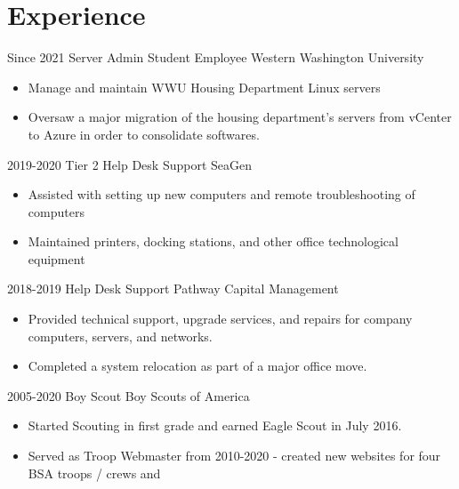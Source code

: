 \documentclass[letterpaper]{twentysecondcv} %
\begin{document}
\begin{twentyshort} %
\end{twentyshort}


\section{Experience}

\begin{twenty} %
	\twentyitem
	{Since 2021}
	{Server Admin Student Employee}
	{Western Washington University}
	{\begin{itemize}
			\item Manage and maintain WWU Housing Department Linux servers
			\item Oversaw a major migration of the housing department's servers from vCenter to Azure in order to consolidate softwares.
		\end{itemize}}
	\twentyitem
	{2019-2020}
	{Tier 2 Help Desk Support}
	{SeaGen}
	{\begin{itemize}
			\item Assisted with setting up new computers and remote troubleshooting of computers
			\item Maintained printers, docking stations, and other office technological equipment
		\end{itemize}}
	\twentyitem
	{2018-2019}
	{Help Desk Support}
	{Pathway Capital Management}
	{\begin{itemize}
			\item Provided technical support, upgrade services, and repairs for company computers, servers, and
			      networks.
			\item Completed a system relocation as part of a major office move.
		\end{itemize}}
	\twentyitem
	{2005-2020}
	{Boy Scout}
	{Boy Scouts of America}
	{\begin{itemize}
			\item Started Scouting in first grade and earned Eagle Scout in July 2016.
			\item Served as Troop Webmaster from 2010-2020 - created new websites for four BSA troops / crews and

\end{itemize}}
\end{twenty}
\end{document}
